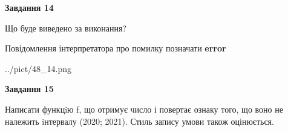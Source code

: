 \documentclass[11pt, ukrainian]{article}
\begin{document}
{\begin {large}
{\begin {center}\textbf{Завдання 14}\end {center}}\par
Що буде виведено за виконання? \par
Повідомлення інтерпретатора про помилку позначати \textbf{error}

\begin{center}
	{../pict/48_14.png}
\end{center}
\newpage

{\begin {center}\textbf{Завдання 15}\end {center}}\par

Написати функцiю f, що отримує число і повертає ознаку того, що воно не належить iнтервалу (2020; 2021). Стиль запису умови також оцінюється.\par
\newpage

\end {large}}
\end{document}
